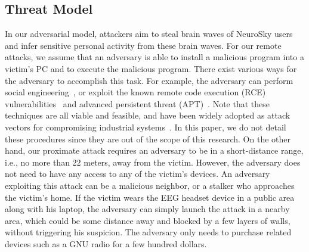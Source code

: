 \subsection{Threat Model}
In our adversarial model, attackers aim to steal brain waves of NeuroSky users and infer sensitive personal activity from these brain waves. For our remote attacks, we assume that an adversary is able to install a malicious program into a victim's PC and to execute the malicious program. There exist various ways for the adversary to accomplish this task. For example, the adversary can perform social engineering~\cite{socialengineering}, or exploit the known remote code execution (RCE) vulnerabilities~\cite{rce} and advanced persistent threat (APT)~\cite{apt}. Note that these techniques are all viable and feasible, and have been widely adopted as attack vectors for compromising industrial systems~\cite{socialengieerstat}\cite{aptstat}\cite{vulstat}. In this paper, we do not detail these procedures since they are out of the scope of this research. On the other hand, our proximate attack requires an adversary to be in a short-distance range, i.e., no more than 22 meters, away from the victim. However, the adversary does not need to have any access to any of the victim's devices. An adversary exploiting this attack can be a malicious neighbor, or a stalker who approaches the victim's home. If the victim wears the EEG headset device in a public area along with his laptop, the adversary can simply launch the attack in a nearby area, which could be some distance away and blocked by a few layers of walls, without triggering his suspicion. The adversary only needs to purchase related devices such as a GNU radio for a few hundred dollars.

